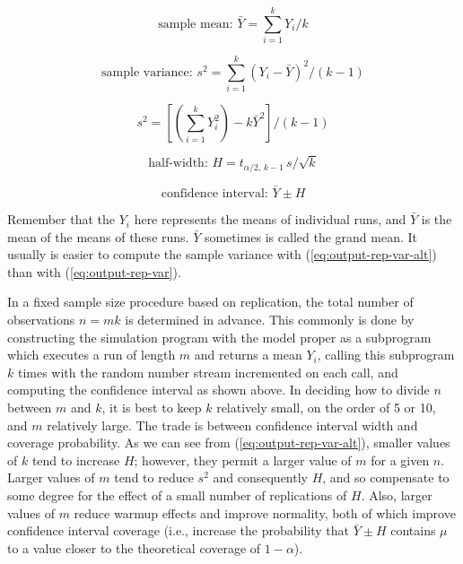 \begin{equation}
\text{sample mean: } \bar{Y} = \sum_{i=1}^{k} Y_i / k
\label{eq:output-rep-mean}
\end{equation}

\begin{equation}
\text{sample variance: } s^2 = \sum_{i=1}^{k} (Y_i - \bar{Y})^2 / (k - 1)
\label{eq:output-rep-var}
\end{equation}

\begin{equation}
s^2 = \left[\left(\sum_{i=1}^{k} Y_i^2\right) - k\bar{Y}^2\right] / (k - 1)
\label{eq:output-rep-var-alt}
\end{equation}

\begin{equation}
\text{half-width: } H = t_{\alpha/2,\,k-1}\, s / \sqrt{k}
\label{eq:output-rep-halfwidth}
\end{equation}

\begin{equation}
\text{confidence interval: } \bar{Y} \pm H
\label{eq:output-rep-ci}
\end{equation}

Remember that the $Y_i$ here represents the means of individual runs, and
$\bar{Y}$ is the mean of the means of these runs. $\bar{Y}$ sometimes is
called the grand mean. It usually is easier to compute the sample variance
with (\ref{eq:output-rep-var-alt}) than with (\ref{eq:output-rep-var}).

In a fixed sample size procedure based on replication, the total number of
observations $n = mk$ is determined in advance. This commonly is done by
constructing the simulation program with the model proper as a subprogram
which executes a run of length $m$ and returns a mean $Y_i$, calling this
subprogram $k$ times with the random number stream incremented on each call,
and computing the confidence interval as shown above. In deciding how to
divide $n$ between $m$ and $k$, it is best to keep $k$ relatively small, on the
order of 5 or 10, and $m$ relatively large. The trade is between confidence
interval width and coverage probability. As we can see from
(\ref{eq:output-rep-var-alt}), smaller values of $k$ tend to increase $H$;
however, they permit a larger value of $m$ for a given $n$. Larger values of
$m$ tend to reduce $s^2$ and consequently $H$, and so compensate to some
degree for the effect of a small number of replications of $H$. Also, larger
values of $m$ reduce warmup effects and improve normality, both of which
improve confidence interval coverage (i.e., increase the probability that
$\bar{Y} \pm H$ contains $\mu$ to a value closer to the theoretical coverage of
$1 - \alpha$).

